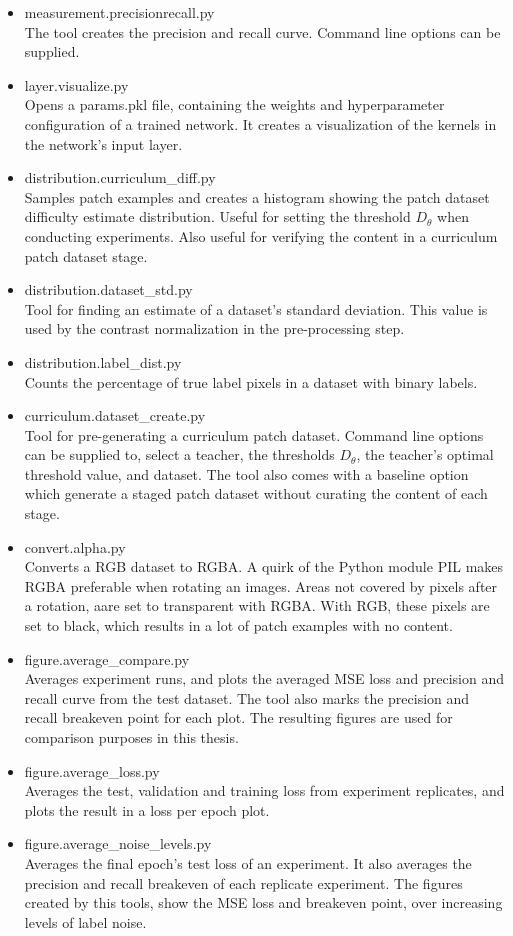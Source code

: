 \begin{itemize}
\item measurement.precisionrecall.py\\
The tool creates the precision and recall curve. Command line options can be supplied.
\item layer.visualize.py\\
Opens a params.pkl file, containing the weights and hyperparameter configuration of a trained network. It creates a visualization of the kernels in the network's input layer.
\item distribution.curriculum\_diff.py\\
Samples patch examples and creates a histogram showing the patch dataset difficulty estimate distribution. Useful for setting the  threshold $D_\theta$ when conducting experiments. Also useful for verifying the content in a curriculum patch dataset stage.
\item distribution.dataset\_std.py\\
Tool for finding an estimate of a dataset's standard deviation. This value is used by the contrast normalization in the pre-processing step.
\item distribution.label\_dist.py\\
Counts the percentage of true label pixels in a dataset with binary labels.
\item curriculum.dataset\_create.py\\
Tool for pre-generating a curriculum patch dataset. Command line options can be supplied to, select a teacher, the thresholds $D_\theta$, the teacher's optimal threshold value, and dataset. The tool also comes with a baseline option which generate a staged patch dataset without curating the content of each stage.
\item convert.alpha.py\\
Converts a RGB dataset to RGBA. A quirk of the Python module PIL makes RGBA preferable when rotating an images. Areas not covered by pixels after a rotation, aare set to transparent with RGBA. With RGB, these pixels are set to black, which results in a lot of patch examples with no content.
\item figure.average\_compare.py\\
Averages experiment runs, and plots the averaged MSE loss and precision and recall curve from the test dataset. The tool also marks the precision and recall breakeven point for each plot. The resulting figures are used for comparison purposes in this thesis.
\item figure.average\_loss.py\\
Averages the test, validation and training loss from experiment replicates, and plots the result in a loss per epoch plot. 
\item figure.average\_noise\_levels.py\\
Averages the final epoch's test loss of an experiment. It also averages the precision and recall breakeven of each replicate experiment. The figures created by this tools, show the MSE loss and breakeven point, over increasing levels of label noise.
\end{itemize}

